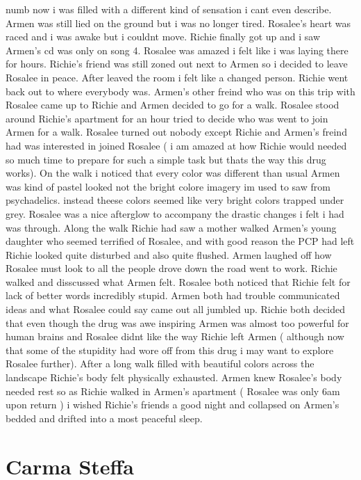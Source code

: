 \documentclass[12pt]{book}
\begin{document}
numb now i was filled with a different kind of sensation i cant even describe. Armen was still lied on the ground but i was no longer tired. Rosalee's heart was raced and i was awake but i couldnt move. Richie finally got up and i saw Armen's cd was only on song 4. Rosalee was amazed i felt like i was laying there for hours. Richie's friend was still zoned out next to Armen so i decided to leave Rosalee in peace. After leaved the room i felt like a changed person. Richie went back out to where everybody was. Armen's other freind who was on this trip with Rosalee came up to Richie and Armen decided to go for a walk. Rosalee stood around Richie's apartment for an hour tried to decide who was went to join Armen for a walk. Rosalee turned out nobody except Richie and Armen's freind had was interested in joined Rosalee ( i am amazed at how Richie would needed so much time to prepare for such a simple task but thats the way this drug works). On the walk i noticed that every color was different than usual Armen was kind of pastel looked not the bright colore imagery im used to saw from psychadelics. instead theese colors seemed like very bright colors trapped under grey. Rosalee was a nice afterglow to accompany the drastic changes i felt i had was through. Along the walk Richie had saw a mother walked Armen's young daughter who seemed terrified of Rosalee, and with good reason the PCP had left Richie looked quite disturbed and also quite flushed. Armen laughed off how Rosalee must look to all the people drove down the road went to work. Richie walked and disscussed what Armen felt. Rosalee both noticed that Richie felt for lack of better words incredibly stupid. Armen both had trouble communicated ideas and what Rosalee could say came out all jumbled up. Richie both decided that even though the drug was awe inspiring Armen was almost too powerful for human brains and Rosalee didnt like the way Richie left Armen ( although now that some of the stupidity had wore off from this drug i may want to explore Rosalee further). After a long walk filled with beautiful colors across the landscape Richie's body felt physically exhausted. Armen knew Rosalee's body needed rest so as Richie walked in Armen's apartment ( Rosalee was only 6am upon return ) i wished Richie's friends a good night and collapsed on Armen's bedded and drifted into a most peaceful sleep.



\chapter{Carma Steffa}
\end{document}
